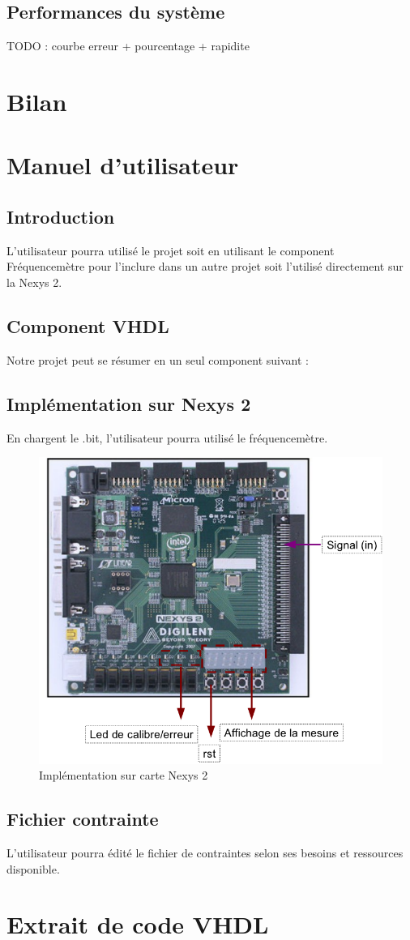 \documentclass[a4paper,11pt]{article}
\begin{document}
  
\subsection{Performances du système}
TODO : courbe erreur + pourcentage + rapidite 


\newpage
\section{Bilan}

\newpage
\appendix
\section{Manuel d'utilisateur}
\subsection{Introduction}
L'utilisateur pourra utilisé le projet soit en utilisant le component Fréquencemètre pour l'inclure dans un autre projet soit l'utilisé directement sur la Nexys 2.

\subsection{Component VHDL}
Notre projet peut se résumer en un seul component suivant :


\subsection{Implémentation sur Nexys 2}
En chargent le .bit, l'utilisateur pourra utilisé le fréquencemètre.
\begin{figure}[H]
\begin{center}
	\includegraphics[scale=.5]{fpga.png}
	\caption{Implémentation sur carte Nexys 2}
\end{center}
\end{figure}

\subsection{Fichier contrainte}
L'utilisateur pourra édité le fichier de contraintes selon ses besoins et ressources disponible.

\newpage
\section{Extrait de code VHDL}

\end{document}
